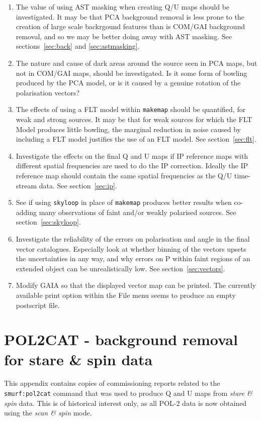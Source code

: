 \documentclass[twoside,11pt]{starlink}
\begin{document}
\begin{enumerate}
\item The value of using AST masking when creating Q/U maps should be
investigated. It may be that PCA background removal is less prone to
the creation of large scale backrgound features than is COM/GAI
background removal, and so we may be better doing away with AST masking.
See sections~\ref{sec:back} and \ref{sec:astmasking}.

\item The nature and cause of dark areas around the source seen in PCA
maps, but not in COM/GAI maps, should be investigated. Is it some form of
bowling produced by the PCA model, or is it caused by a genuine rotation
of the polarisation vectors?

\item The effects of using a FLT model within \texttt{makemap} should be
quantified, for weak and strong sources. It may be that for weak sources
for which the FLT Model produces little bowling, the marginal reduction
in noise caused by including a FLT model justifies the use of an FLT model.
See section~\ref{sec:flt}.

\item Investigate the effects on the final Q and U maps if IP reference
maps with different spatial frequencies are used to do the IP correction.
Ideally the IP reference map should contain the same spatial frequencies
as the Q/U time-stream data. See section~\ref{sec:ip}.

\item See if using \texttt{skyloop} in place of \texttt{makemap} produces
better results when co-adding many observations of faint and/or weakly
polarised sources.  See section~\ref{sec:skyloop}.

\item Investigate the reliability of the errors on polarisation and angle
in the final vector catalogues. Especially look at whether binning of the
vectors upsets the uncertainties in any way, and why errors on P within faint
regions of an extended object can be unrealistically low. See
section~\ref{sec:vectors}.

\item Modify GAIA so that the displayed vector map can be printed. The
currently available print option within the File menu seems to produce an
empty postscript file.
\end{enumerate}

\appendix

\section{POL2CAT - background removal for stare \& spin data}
\label{app:stare}
This appendix contains copies of commissioning reports related to the
\texttt{smurf:pol2cat} command that was used to produce Q and U maps from
\emph{stare \& spin} data. This is of historical interest only, as all POL-2
data is now obtained using the \emph{scan \& spin} mode.
\end{document}
